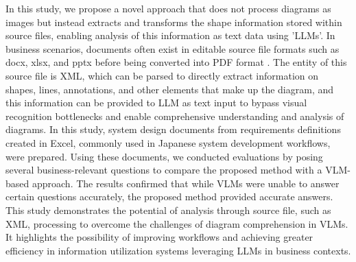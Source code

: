 In this study, we propose a novel approach that does not process diagrams as images but instead extracts and transforms the shape information stored within source files, enabling analysis of this information as text data using 'LLMs'. In business scenarios, documents often exist in editable source file formats such as docx, xlsx, and pptx before being converted into PDF format \citep{noauthor_isoiec_nodate}.  The entity of this source file is XML, which can be parsed to directly extract information on shapes, lines, annotations, and other elements that make up the diagram, and this information can be provided to LLM as text input to bypass visual recognition bottlenecks and enable comprehensive understanding and analysis of diagrams. In this study, system design documents from requirements definitions created in Excel, commonly used in Japanese system development workflows, were prepared. Using these documents, we conducted evaluations by posing several business-relevant questions to compare the proposed method with a VLM-based approach. The results confirmed that while VLMs were unable to answer certain questions accurately, the proposed method provided accurate answers. This study demonstrates the potential of analysis through source file, such as XML, processing to overcome the challenges of diagram comprehension in VLMs. It highlights the possibility of improving workflows and achieving greater efficiency in information utilization systems leveraging LLMs in business contexts.

